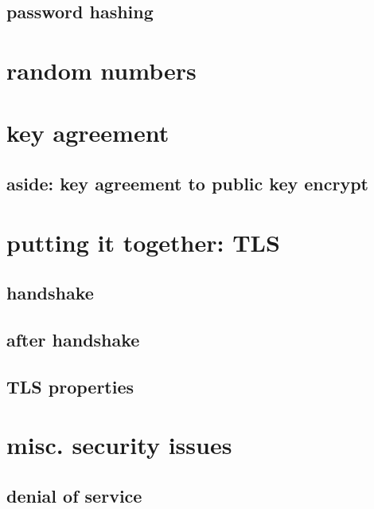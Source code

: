 

\subsection{password hashing}



\section{random numbers}


\section{key agreement}



\subsection{aside: key agreement to public key encrypt}


\section{putting it together: TLS}

\subsection{handshake}


\subsection{after handshake}


\subsection{TLS properties}


\section{misc. security issues}

\subsection{denial of service}


